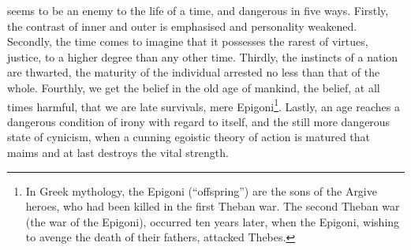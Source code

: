 seems to be an enemy to the life of a time, and
dangerous in five ways. Firstly, the contrast of inner and outer is
emphasised and personality weakened. Secondly, the time comes to
imagine that it possesses the rarest of virtues, justice, to a higher
degree than any other time. Thirdly, the instincts of a nation are
thwarted, the maturity of the individual arrested no less than that
of the whole. Fourthly, we get the belief in the old age of mankind,
the belief, at all times harmful, that we are late survivals, mere
Epigoni\footnote{In Greek mythology, the Epigoni (\enquote{offspring}) are the sons of the Argive heroes, who had been killed in the first Theban war. The second Theban war (the war of the Epigoni), occurred ten years later, when the Epigoni, wishing to avenge the death of their fathers, attacked Thebes.}. Lastly, an age reaches a dangerous condition of irony with
regard to itself, and the still more dangerous state of cynicism,
when a cunning egoistic theory of action is matured that maims and at
last destroys the vital strength.

